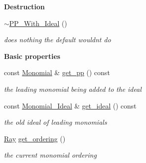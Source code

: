 \begin{Indent}\textbf{ Destruction}\par
\begin{DoxyCompactItemize}
\item 
\mbox{\label{group___g_b_computation_a1dd0ce9a355f10837a180b1599a2666f}} 
\hyperlink{group___g_b_computation_a1dd0ce9a355f10837a180b1599a2666f}{$\sim$\+P\+P\+\_\+\+With\+\_\+\+Ideal} ()
\begin{DoxyCompactList}\small\item\em does nothing the default wouldn\textquotesingle{}t do \end{DoxyCompactList}\end{DoxyCompactItemize}
\end{Indent}
\begin{Indent}\textbf{ Basic properties}\par
\begin{DoxyCompactItemize}
\item 
\mbox{\label{group___g_b_computation_a0b70c63442c37067103f9939b17ef4ec}} 
const \hyperlink{group__polygroup_class_monomial}{Monomial} \& \hyperlink{group___g_b_computation_a0b70c63442c37067103f9939b17ef4ec}{get\+\_\+pp} () const
\begin{DoxyCompactList}\small\item\em the leading monomial being added to the ideal \end{DoxyCompactList}\item 
\mbox{\label{group___g_b_computation_acb57c1467a4d6e622143057fde1ba1b6}} 
const \hyperlink{group__polygroup_class_monomial___ideal}{Monomial\+\_\+\+Ideal} \& \hyperlink{group___g_b_computation_acb57c1467a4d6e622143057fde1ba1b6}{get\+\_\+ideal} () const
\begin{DoxyCompactList}\small\item\em the old ideal of leading monomials \end{DoxyCompactList}\item 
\mbox{\label{group___g_b_computation_a9d01761e8d285ddbaa35214d8214a74b}} 
\hyperlink{group___c_l_s_solvers_class_l_p___solvers_1_1_ray}{Ray} \hyperlink{group___g_b_computation_a9d01761e8d285ddbaa35214d8214a74b}{get\+\_\+ordering} ()
\begin{DoxyCompactList}\small\item\em the current monomial ordering \end{DoxyCompactList}\item 

\end{DoxyCompactItemize}
\end{Indent}
